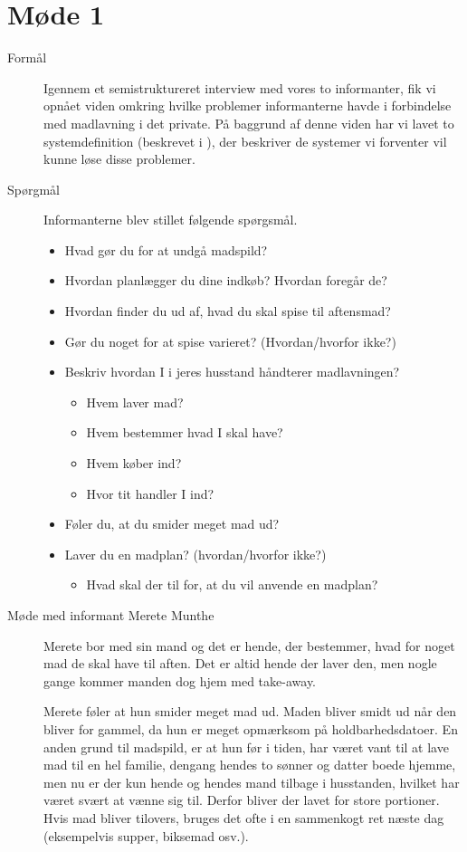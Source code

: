 \section{Møde 1}
\begin{description}
\item[Formål] Igennem et semistruktureret interview med vores to informanter, fik vi opnået viden omkring hvilke problemer informanterne havde i forbindelse med madlavning i det private. På baggrund af denne viden har vi lavet to systemdefinition (beskrevet i ), der beskriver de systemer vi forventer vil kunne løse disse problemer.

\item[Spørgmål] Informanterne blev stillet følgende spørgsmål.

\begin{itemize}[noitemsep]
\item Hvad gør du for at undgå madspild?
\item Hvordan planlægger du dine indkøb? Hvordan foregår de?
\item Hvordan finder du ud af, hvad du skal spise til aftensmad?
\item Gør du noget for at spise varieret? (Hvordan/hvorfor ikke?)
\item Beskriv hvordan I i jeres husstand håndterer madlavningen?
\begin{itemize}[noitemsep]
\item Hvem laver mad?
\item Hvem bestemmer hvad I skal have?
\item Hvem køber ind?
\item Hvor tit handler I ind?
\end{itemize}
\item Føler du, at du smider meget mad ud?
\item Laver du en madplan? (hvordan/hvorfor ikke?)
\begin{itemize}[noitemsep]
\item Hvad skal der til for, at du vil anvende en madplan?
\end{itemize}
\end{itemize}

\item[Møde med informant Merete Munthe]
Merete bor med sin mand og det er hende, der bestemmer, hvad for noget mad de skal have til aften. Det er altid hende der laver den, men nogle gange kommer manden dog hjem med take-away.

Merete føler at hun smider meget mad ud. Maden bliver smidt ud når den bliver for gammel, da hun er meget opmærksom på holdbarhedsdatoer. En anden grund til madspild, er at hun før i tiden, har været vant til at lave mad til en hel familie, dengang hendes to sønner og datter boede hjemme, men nu er der kun hende og hendes mand tilbage i husstanden, hvilket har været svært at vænne sig til. Derfor bliver der lavet for store portioner. Hvis mad bliver tilovers, bruges det ofte i en sammenkogt ret næste dag (eksempelvis supper, biksemad osv.).


\end{description}
